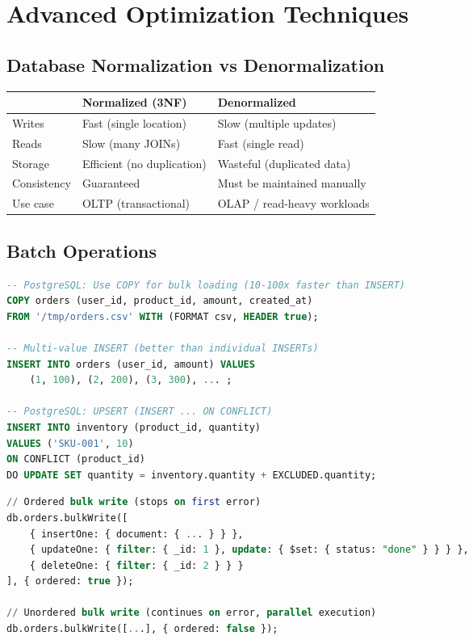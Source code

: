 \documentclass[12pt,a4paper]{article}
\begin{document}
\section{Advanced Optimization Techniques}

\subsection{Database Normalization vs Denormalization}

\begin{center}
\begin{tabular}{lp{5cm}p{5cm}}
\toprule
& \textbf{Normalized (3NF)} & \textbf{Denormalized} \\
\midrule
Writes & Fast (single location) & Slow (multiple updates) \\
Reads & Slow (many JOINs) & Fast (single read) \\
Storage & Efficient (no duplication) & Wasteful (duplicated data) \\
Consistency & Guaranteed & Must be maintained manually \\
Use case & OLTP (transactional) & OLAP / read-heavy workloads \\
\bottomrule
\end{tabular}
\end{center}

\subsection{Batch Operations}

\begin{lstlisting}[language=SQL, caption={Batch insert optimization}]
-- PostgreSQL: Use COPY for bulk loading (10-100x faster than INSERT)
COPY orders (user_id, product_id, amount, created_at)
FROM '/tmp/orders.csv' WITH (FORMAT csv, HEADER true);

-- Multi-value INSERT (better than individual INSERTs)
INSERT INTO orders (user_id, amount) VALUES
    (1, 100), (2, 200), (3, 300), ... ;

-- PostgreSQL: UPSERT (INSERT ... ON CONFLICT)
INSERT INTO inventory (product_id, quantity)
VALUES ('SKU-001', 10)
ON CONFLICT (product_id)
DO UPDATE SET quantity = inventory.quantity + EXCLUDED.quantity;
\end{lstlisting}

\begin{lstlisting}[language=SQL, caption={MongoDB bulk operations}]
// Ordered bulk write (stops on first error)
db.orders.bulkWrite([
    { insertOne: { document: { ... } } },
    { updateOne: { filter: { _id: 1 }, update: { $set: { status: "done" } } } },
    { deleteOne: { filter: { _id: 2 } } }
], { ordered: true });

// Unordered bulk write (continues on error, parallel execution)
db.orders.bulkWrite([...], { ordered: false });
\end{lstlisting}
\end{document}
